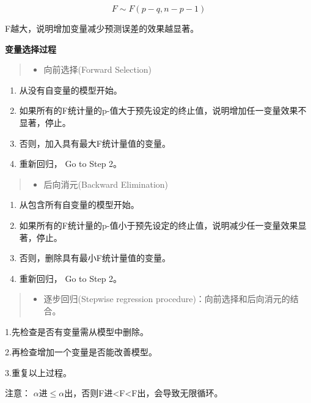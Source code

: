 \documentclass[]{ctexbook}
\providecommand{\tightlist}{%
  \setlength{\itemsep}{0pt}\setlength{\parskip}{0pt}}
\begin{document}
\[F\sim F(p-q,n-p-1)\]

F越大，说明增加变量减少预测误差的效果越显著。

\textbf{变量选择过程}

\begin{quote}
\begin{itemize}
\tightlist
\item
  向前选择(Forward Selection)
\end{itemize}
\end{quote}

\begin{enumerate}
\def\labelenumi{\arabic{enumi}.}
\item
  从没有自变量的模型开始。
\item
  如果所有的F统计量的p-值大于预先设定的终止值，说明增加任一变量效果不显著，停止。
\item
  否则，加入具有最大F统计量值的变量。
\item
  重新回归， Go to Step 2。
\end{enumerate}

\begin{quote}
\begin{itemize}
\tightlist
\item
  后向消元(Backward Elimination)
\end{itemize}
\end{quote}

\begin{enumerate}
\def\labelenumi{\arabic{enumi}.}
\item
  从包含所有自变量的模型开始。
\item
  如果所有的F统计量的p-值小于预先设定的终止值，说明减少任一变量效果显著，停止。
\item
  否则，删除具有最小F统计量值的变量。
\item
  重新回归， Go to Step 2。
\end{enumerate}

\begin{quote}
\begin{itemize}
\tightlist
\item
  逐步回归(Stepwise regression procedure)：向前选择和后向消元的结合。
\end{itemize}
\end{quote}

1.先检查是否有变量需从模型中删除。

2.再检查增加一个变量是否能改善模型。

3.重复以上过程。

注意： \(\alpha\)进\(\leq \alpha\)出，否则F进\textless F\textless F出，会导致无限循环。
\end{document}
